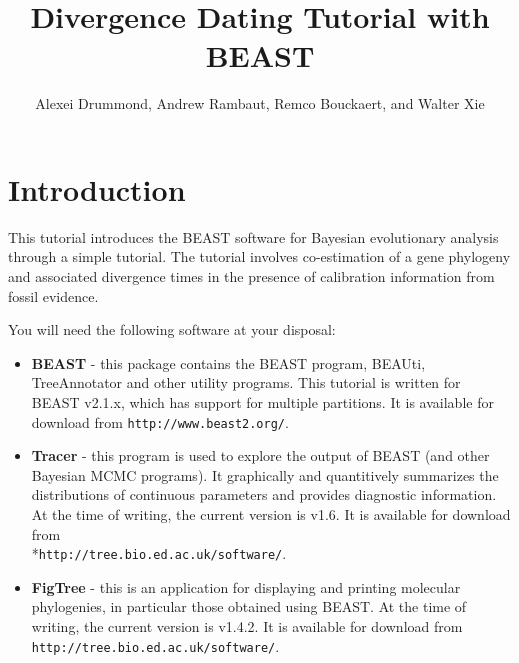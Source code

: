 \documentclass[11pt]{article}
\title{Divergence Dating Tutorial with BEAST {\BEASTVersion}}
\author{Alexei Drummond, Andrew Rambaut, Remco Bouckaert, and Walter Xie}
\newcommand{\BEASTVersion}{2.1.x}
\newcommand{\TracerVersion}{1.6}
\newcommand{\FigTreeVersion}{1.4.2}
\theoremstyle{plain}%
\theoremstyle{definition}
\theoremstyle{remark}
\begin{document}
\maketitle

\newcommand{\chainLength}{{3,000,000}}
\newcommand{\logEvery}{{1,000}}
\newcommand{\screenEvery}{{10,000}}
\newcommand{\mccTree}{{\texttt{Primates.MCC.tree}}}

\section{Introduction}

This tutorial introduces the BEAST software for Bayesian evolutionary analysis through a simple tutorial. The tutorial involves co-estimation of a gene phylogeny and associated divergence times in the presence of calibration information from fossil evidence. 

You will need the following software at your disposal:

\begin{itemize}

\item {\bf BEAST} - this package contains the BEAST program, BEAUti, TreeAnnotator and other utility programs. This tutorial is written for BEAST v{\BEASTVersion}, which has support for multiple partitions. It is available for download from \texttt{http://www.beast2.org/}.
\item {\bf Tracer} - this program is used to explore the output of BEAST (and other Bayesian MCMC programs). It graphically and
quantitively summarizes the distributions of continuous parameters and provides diagnostic information. At the time of
writing, the current version is v{\TracerVersion}. It is available for download from\\*\texttt{http://tree.bio.ed.ac.uk/software/}.
\item {\bf FigTree} - this is an application for displaying and printing molecular phylogenies, in particular those obtained using
BEAST. At the time of writing, the current version is v{\FigTreeVersion}. It is available for download from \texttt{http://tree.bio.ed.ac.uk/software/}.
\end{itemize}


\end{document}
